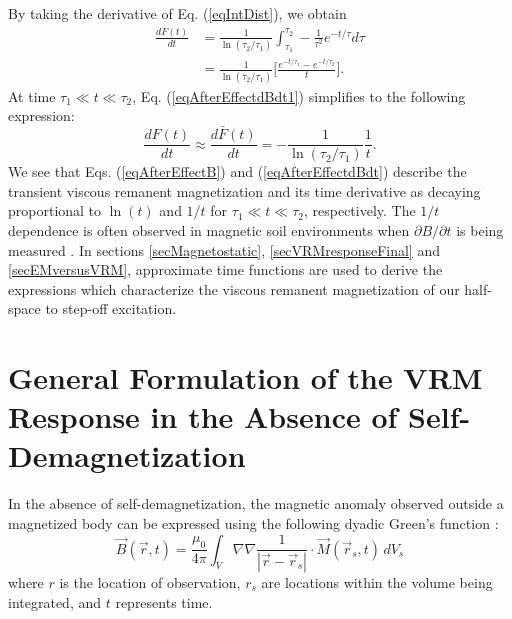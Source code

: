 \documentclass[onecolumn]{IEEEtran} %
\begin{document}
By taking the derivative of Eq. (\ref{eqIntDist}), we obtain
\begin{align}
\label{eqAfterEffectdBdt1}
\frac{d F(t)}{dt} &= \frac{1}{\ln(\tau_2/\tau_1)} \int^{\tau_2}_{\tau_1} - \frac{1}{\tau^2} e^{-t/\tau} d \tau \nonumber \\
& = \frac{1}{\ln(\tau_2/\tau_1)} \Bigg [ \frac{e^{-t/\tau_1} -e^{-t/\tau_2} }{t} \Bigg ].
\end{align}
At time $\tau_1 \ll t \ll \tau_2$, Eq. (\ref{eqAfterEffectdBdt1}) simplifies to the following expression:
\begin{equation}
\label{eqAfterEffectdBdt}
\frac{dF(t)}{d t} \approx \frac{d \bar F(t)}{d t} = -\frac{1}{\ln(\tau_2/\tau_1)} \frac{1}{t}.
\end{equation}
We see that Eqs. (\ref{eqAfterEffectB}) and (\ref{eqAfterEffectdBdt}) describe the transient viscous remanent magnetization and its time derivative as decaying proportional to $\ln(t)$ and $1/t$ for $\tau_1 \ll t \ll \tau_2$, respectively. The $1/t$ dependence is often observed in magnetic soil environments when $\partial B/\partial t$ is being measured \cite{Dabas1992,Buselli1982,Pasion2007}. In sections \ref{secMagnetostatic}, \ref{secVRMresponseFinal} and \ref{secEMversusVRM}, approximate time functions are used to derive the expressions which characterize the viscous remanent magnetization of our half-space to step-off excitation.




\section{General Formulation of the VRM Response in the Absence of Self-Demagnetization}
\label{secSelfDemag}

In the absence of self-demagnetization,  the magnetic anomaly observed outside a magnetized body can be expressed using the following dyadic Green's function \cite{Blakely1996}:
\begin{equation}
\vec B(\vec r,t) = \frac{\mu_0}{4 \pi} \int_{V} \nabla \nabla \frac{1}{| \vec r - \vec r_s |} \cdot \vec M(\vec r_s, t) \, dV_s
\label{Bfield}
\end{equation}
where $r$ is the location of observation, $r_s$ are locations within the volume being integrated, and $t$ represents time.
\\
\end{document}
